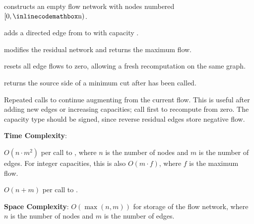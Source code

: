 \begin{compactitem}
  \item {} constructs an empty flow network with nodes numbered $[0, {\inlinecodemath{n}})$.
  \item {} adds a directed edge from  to  with capacity .
  \item {} modifies the residual network and returns the maximum flow.
  \item {} resets all edge flows to zero, allowing a fresh recomputation on the same graph.
  \item {} returns the source side of a minimum cut after  has been called.
\end{compactitem}

Repeated calls to  continue augmenting from the current flow. This is useful after adding new edges or increasing capacities; call  first to recompute from zero. The capacity type  should be signed, since reverse residual edges store negative flow.

\textbf{Time Complexity}:
\begin{compactitem}
  \item $O(n \cdot m^{2})$ per call to , where $n$ is the number of nodes and $m$ is the number of edges. For integer capacities, this is also $O(m \cdot f)$, where $f$ is the maximum flow.
  \item $O(n + m)$ per call to .
\end{compactitem}

\textbf{Space Complexity}: $O(\max\left(n, m\right))$ for storage of the flow network, where $n$ is the number of nodes and $m$ is the number of edges.

